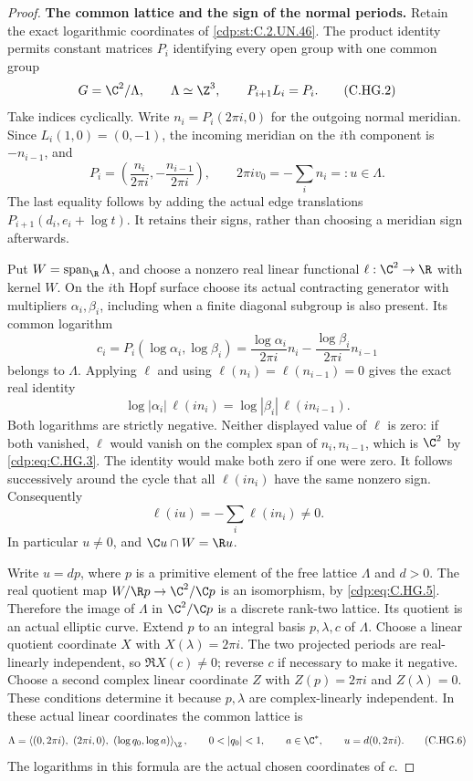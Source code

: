 \begin{proof}
\par\medskip\noindent\textbf{The common lattice and the sign of the normal periods.}
Retain the exact logarithmic coordinates of \ref{cdp:st:C.2.UN.46}.
The product identity permits constant matrices $P_i$
identifying every open group with one common group
\[
                  G=\C^2/\Lambda,\qquad \Lambda\simeq\Z^3,
                  \qquad P_{i+1}L_i=P_i.
\tag{C.HG.2}\label{cdp:eq:C.HG.2}
\]
Take indices cyclically. Write $n_i=P_i(2\pi i,0)$
for the outgoing normal meridian. Since
$L_i(1,0)=(0,-1)$, the incoming meridian on the
$i$th component is $-n_{i-1}$, and
\[
 P_i=\left(\frac{n_i}{2\pi i},
                   -\frac{n_{i-1}}{2\pi i}\right),
 \qquad
 2\pi i v_0=-\sum_i n_i=:u\in\Lambda.
\tag{C.HG.3}\label{cdp:eq:C.HG.3}
\]
The last equality follows by adding the actual
edge translations $P_{i+1}(d_i,e_i+\log t)$.
It retains their signs, rather than choosing a
meridian sign afterwards.

Put $W=\operatorname{span}_{\R}\Lambda$, and choose
a nonzero real linear functional $\ell:\C^2\to\R$
with kernel $W$. On the $i$th Hopf surface choose
its actual contracting generator with multipliers
$\alpha_i,\beta_i$, including when a finite diagonal
subgroup is also present. Its common logarithm
\[
 c_i=P_i(\log\alpha_i,\log\beta_i)
       =\frac{\log\alpha_i}{2\pi i}n_i
          -\frac{\log\beta_i}{2\pi i}n_{i-1}
\]
belongs to $\Lambda$. Applying $\ell$ and using
$\ell(n_i)=\ell(n_{i-1})=0$ gives the exact real
identity
\[
 \log|\alpha_i|\,\ell(i n_i)
       =\log|\beta_i|\,\ell(i n_{i-1}).
\tag{C.HG.4}\label{cdp:eq:C.HG.4}
\]
Both logarithms are strictly negative.
Neither displayed value of $\ell$ is zero: if
both vanished, $\ell$ would vanish on the complex
span of $n_i,n_{i-1}$, which is $\C^2$ by
\eqref{cdp:eq:C.HG.3}. The identity would make both zero if
one were zero. It follows successively around
the cycle that all $\ell(i n_i)$ have the same
nonzero sign. Consequently
\[
                       \ell(iu)=-\sum_i\ell(i n_i)\ne0.
\tag{C.HG.5}\label{cdp:eq:C.HG.5}
\]
In particular $u\ne0$, and $\C u\cap W=\R u$.

Write $u=d p$, where $p$ is a primitive element
of the free lattice $\Lambda$ and $d>0$.
The real quotient map
$W/\R p\to\C^2/\C p$ is an isomorphism, by
\eqref{cdp:eq:C.HG.5}. Therefore the image of $\Lambda$ in
$\C^2/\C p$ is a discrete rank-two lattice.
Its quotient is an actual elliptic curve.
Extend $p$ to an integral basis $p,\lambda,c$
of $\Lambda$. Choose a linear quotient
coordinate $X$ with $X(\lambda)=2\pi i$.
The two projected periods are real-linearly
independent, so $\Re X(c)\ne0$; reverse $c$
if necessary to make it negative. Choose a
second complex linear coordinate $Z$ with
$Z(p)=2\pi i$ and $Z(\lambda)=0$. These
conditions determine it because $p,\lambda$
are complex-linearly independent. In these
actual linear coordinates the common lattice
is
\[
 \Lambda=\left\langle
     (0,2\pi i),\ (2\pi i,0),\
     (\log q_0,\log a)\right\rangle_{\Z},
 \qquad 0<|q_0|<1,\qquad a\in\C^*,
 \qquad u=d(0,2\pi i).
\tag{C.HG.6}\label{cdp:eq:C.HG.6}
\]
The logarithms in this formula are the actual
chosen coordinates of $c$.


\end{proof}
